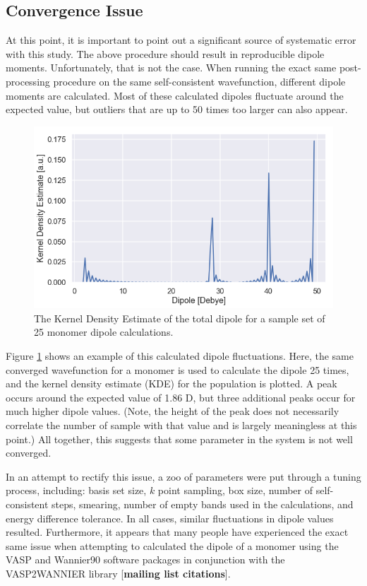         \subsection{Convergence Issue} 
        \label{sec:convergence_issue}
        At this point, it is important to point out a significant source of systematic error with this study. The above procedure should result in reproducible dipole moments. Unfortunately, that is not the case. When running the exact same post-processing procedure on the same self-consistent wavefunction, different dipole moments are calculated. Most of these calculated dipoles fluctuate around the expected value, but outliers that are up to 50 times too larger can also appear.
        
        \begin{figure}
            \centering
            \includegraphics[width=0.9\linewidth]{Figures/System/pc_bad_convergence.png}
            \caption{The Kernel Density Estimate of the total dipole for a sample set of 25 monomer dipole calculations.}
            \label{fig:pc_bad_convergence}
        \end{figure}
        
        Figure \ref{fig:pc_bad_convergence} shows an example of this calculated dipole fluctuations. Here, the same converged wavefunction for a monomer is used to calculate the dipole 25 times, and the kernel density estimate (KDE) for the population is plotted. A peak occurs around the expected value of 1.86 D, but three additional peaks occur for much higher dipole values. (Note, the height of the peak does not necessarily correlate the number of sample with that value and is largely meaningless at this point.) All together, this suggests that some parameter in the system is not well converged.
        
        In an attempt to rectify this issue, a zoo of parameters were put through a tuning process, including: basis set size, $k$ point sampling, box size, number of self-consistent steps, smearing, number of empty bands used in the calculations, and energy difference tolerance. In all cases, similar fluctuations in dipole values resulted. Furthermore, it appears that many people have experienced the exact same issue when attempting to calculated the dipole of a monomer using the VASP and Wannier90 software packages in conjunction with the VASP2WANNIER library [\textbf{mailing list citations}]. 
        
